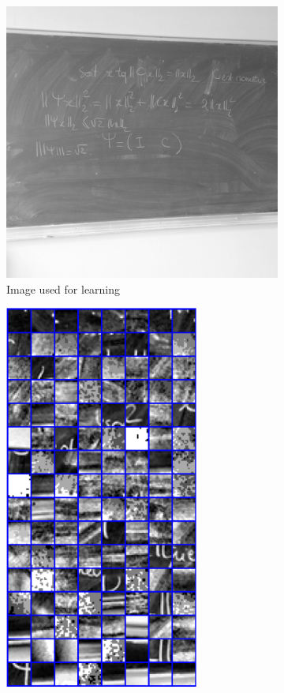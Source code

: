 \begin{figure}[!ht]\centering
\begin{subfigure}[b]{0.40\textwidth}\centering
	\includegraphics[width=\textwidth]{figures/ksvd/tableau_512x512.png}
	\caption{Image used for learning}
\end{subfigure}
\begin{subfigure}[b]{0.29\textwidth}\centering
	\includegraphics[width=0.7\textwidth]{figures/ksvd/patches.pdf}

\end{subfigure}
\end{figure}
